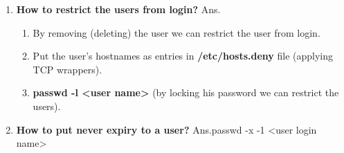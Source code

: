\begin{enumerate}
    \bigskip 
    \bigskip

    \item \textbf{How to restrict the users from login?}
    \newline
    Ans.\begin{enumerate}
          \item  By removing (deleting) the user we can restrict the user from login.
          \item Put the user's hostnames as entries in  \textbf{/etc/hosts.deny }   file (applying TCP wrappers).
          \item \textbf{passwd   -l    <user name> } (by locking his password we can restrict the users).
        \end{enumerate}
    
    \bigskip
    \bigskip

    \item \textbf{How to put never expiry to a user?}
    \newline
    Ans.passwd     -x    -1    <user login name>


    

    

           
       
     
    

                    
                         
    








        
        








    
    







        

    














     

                     


 


    


    


    



\end{enumerate}
